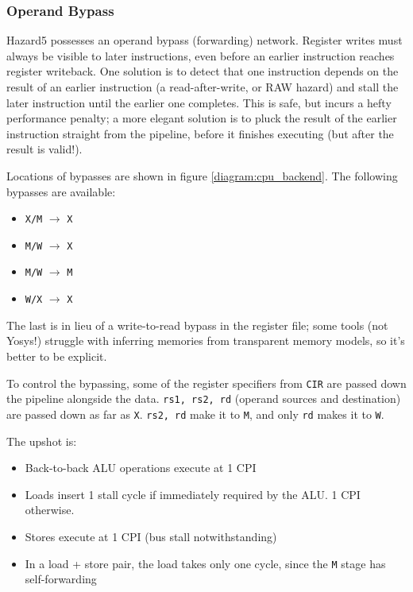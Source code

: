 \newpage


\subsubsection{Operand Bypass}

Hazard5 possesses an operand bypass (forwarding) network. Register writes must always be visible to later instructions, even before an earlier instruction reaches register writeback. One solution is to detect that one instruction depends on the result of an earlier instruction (a read-after-write, or RAW hazard) and stall the later instruction until the earlier one completes. This is safe, but incurs a hefty performance penalty; a more elegant solution is to pluck the result of the earlier instruction straight from the pipeline, before it finishes executing (but after the result is valid!).

Locations of bypasses are shown in figure \ref{diagram:cpu_backend}. The following bypasses are available:

\begin{itemize}
	\item {\tt X/M} $\to$ {\tt X}
	\item {\tt M/W} $\to$ {\tt X}
	\item {\tt M/W} $\to$ {\tt M}
	\item {\tt W/X} $\to$ {\tt X}
\end{itemize}

The last is in lieu of a write-to-read bypass in the register file; some tools (not Yosys!) struggle with inferring memories from transparent memory models, so it's better to be explicit.

To control the bypassing, some of the register specifiers from {\tt CIR} are passed down the pipeline alongside the data. {\tt rs1, rs2, rd} (operand sources and destination) are passed down as far as {\tt X}. {\tt rs2, rd} make it to {\tt M}, and only {\tt rd} makes it to {\tt W}.

The upshot is:

\begin{itemize}
	\item Back-to-back ALU operations execute at 1 CPI
	\item Loads insert 1 stall cycle if immediately required by the ALU. 1 CPI otherwise.
	\item Stores execute at 1 CPI (bus stall notwithstanding)
	\item In a load + store pair, the load takes only one cycle, since the {\tt M} stage has self-forwarding
\end{itemize}

